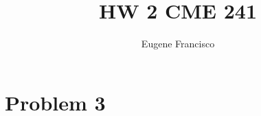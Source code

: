 \documentclass{article}
\title{HW 2 CME 241}
\author{Eugene Francisco}
\date{}
\begin{document}
\maketitle

\section*{Problem 3}
\end{document}
